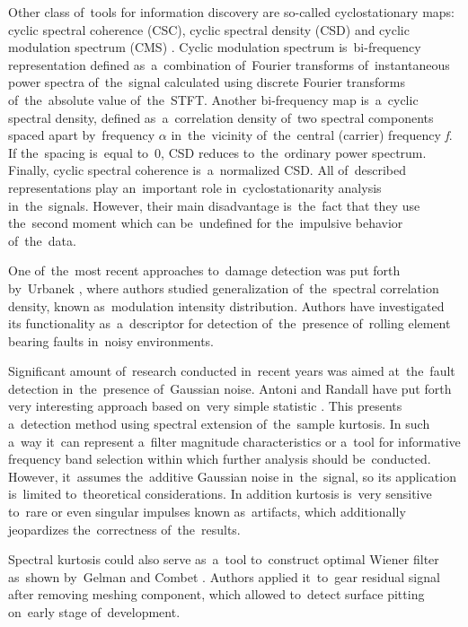 Other class of~tools for information discovery are so-called cyclostationary maps: cyclic spectral coherence (CSC), cyclic spectral density (CSD) and cyclic modulation spectrum (CMS) \cite{antoni3}. Cyclic modulation spectrum is~bi-frequency representation defined as~a~combination of~Fourier transforms of~instantaneous power spectra of~the~signal calculated using discrete Fourier transforms of~the~absolute value of~the~STFT. Another bi-frequency map is~a~cyclic spectral density, defined as~a~correlation density of~two spectral components spaced apart by~frequency $\alpha$ in~the~vicinity of~the~central (carrier) frequency \textit{f}. If the~spacing is~equal to~0, CSD reduces to~the~ordinary power spectrum. Finally, cyclic spectral coherence is~a~normalized CSD. All of~described representations play an~important role in~cyclostationarity analysis in~the~signals. However, their main disadvantage is~the~fact that they use the~second moment which can be~undefined for the~impulsive behavior of~the~data. 

One of~the~most recent approaches to~damage detection was put forth by~Urbanek \cite{urbanek2014integrated}, \cite{URBANEK2012399} where authors studied generalization of~the~spectral correlation density, known as~modulation intensity distribution. Authors have investigated its functionality as~a~descriptor for detection of~the~presence of~rolling element bearing faults in~noisy environments. 

Significant amount of~research conducted in~recent years was aimed at~the~fault detection in~the~presence of~Gaussian noise. Antoni and Randall have put forth very interesting approach based on~very simple statistic \cite{antoni_randall}. This presents a~detection method using spectral extension of~the~sample kurtosis. In such a~way it~can represent a~filter magnitude characteristics or a~tool for informative frequency band selection within which further analysis should be~conducted. However, it~assumes the~additive Gaussian noise in~the~signal, so its application is~limited to~theoretical considerations. In addition kurtosis is~very sensitive to~rare or even singular impulses known as~artifacts, which additionally jeopardizes the~correctness of~the~results. 

Spectral kurtosis could also serve as~a~tool to~construct optimal Wiener filter as~shown by~Gelman and Combet \cite{combet2009optimal}. Authors applied it~to~gear residual signal after removing meshing component, which allowed to~detect surface pitting on~early stage of~development.

